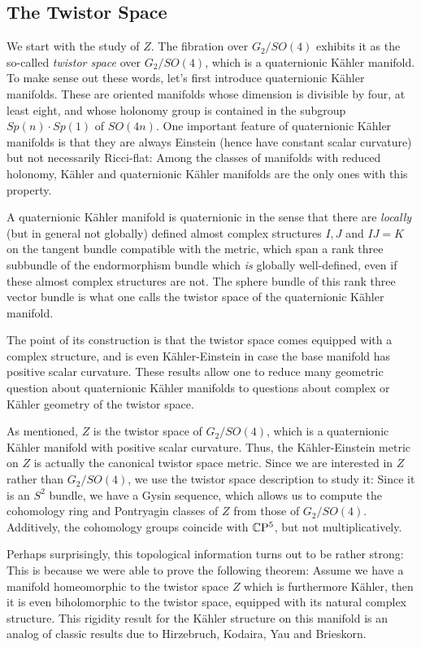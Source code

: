 \documentclass[parskip=half]{scrartcl}
\begin{document}
\subsection{The Twistor Space}

We start with the study of $Z$. The fibration over $G_2/SO(4)$ exhibits it as the so-called \emph{twistor space} over $G_2/SO(4)$, which is a quaternionic K\"ahler manifold. To make sense out these words, let's first introduce quaternionic K\"ahler manifolds. These are oriented manifolds whose dimension is divisible by four, at least eight, and whose holonomy group is contained in the subgroup $Sp(n)\cdot Sp(1)$ of $SO(4n)$. One important feature of quaternionic K\"ahler manifolds is that they are always Einstein (hence have constant scalar curvature) but not necessarily Ricci-flat: Among the classes of manifolds with reduced holonomy, K\"ahler and quaternionic K\"ahler manifolds are the only ones with this property.

A quaternionic K\"ahler manifold is quaternionic in the sense that there are \emph{locally} (but in general not globally) defined almost complex structures $I,J$ and $IJ=K$ on the tangent bundle compatible with the metric, which span a rank three subbundle of the endormorphism bundle which \emph{is} globally well-defined, even if these almost complex structures are not. The sphere bundle of this rank three vector bundle is what one calls the twistor space of the quaternionic K\"ahler manifold.

The point of its construction is that the twistor space comes equipped with a complex structure, and is even K\"ahler-Einstein in case the base manifold has positive scalar curvature. These results allow one to reduce many geometric question about quaternionic K\"ahler manifolds to questions about complex or K\"ahler geometry of the twistor space.

As mentioned, $Z$ is the twistor space of $G_2/SO(4)$, which is a quaternionic K\"ahler manifold with positive scalar curvature. Thus, the K\"ahler-Einstein metric on $Z$ is actually the canonical twistor space metric. Since we are interested in $Z$ rather than $G_2/SO(4)$, we use the twistor space description to study it: Since it is an $S^2$ bundle, we have a Gysin sequence, which allows us to compute the cohomology ring and Pontryagin classes of $Z$ from those of $G_2/SO(4)$. Additively, the cohomology groups coincide with $\mathbb{C}\mathrm{P}^5$, but not multiplicatively.

Perhaps surprisingly, this topological information turns out to be rather strong: This is because we were able to prove the following theorem: Assume we have a manifold homeomorphic to the twistor space $Z$ which is furthermore K\"ahler, then it is even biholomorphic to the twistor space, equipped with its natural complex structure. This rigidity result for the K\"ahler structure on this manifold is an analog of classic results due to Hirzebruch, Kodaira, Yau and Brieskorn. 
\end{document}
